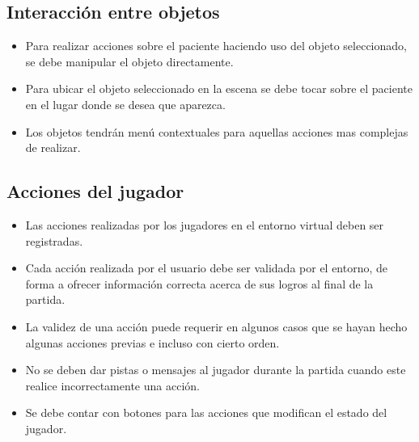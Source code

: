\subsection{Interacción entre objetos}
\begin{itemize}
\item Para realizar acciones sobre el paciente haciendo uso del objeto seleccionado, se debe manipular el objeto
directamente.
\item Para ubicar el objeto seleccionado en la escena se debe tocar sobre el paciente en el lugar donde se desea
que aparezca.
\item Los objetos tendrán menú contextuales para aquellas acciones mas complejas de realizar.
\end{itemize}

\subsection{Acciones del jugador}
\begin{itemize}
\item Las acciones realizadas por los jugadores en el entorno virtual deben ser registradas.
\item Cada acción realizada por el usuario debe ser validada por el entorno, de forma a ofrecer información
correcta acerca de sus logros al final de la partida.
\item La validez de una acción puede requerir en algunos casos que se hayan hecho algunas acciones previas e incluso con cierto orden.
\item No se deben dar pistas o mensajes al jugador durante la partida cuando este realice incorrectamente una acción.
\item Se debe contar con botones para las acciones que modifican el estado del jugador.
\end{itemize}
